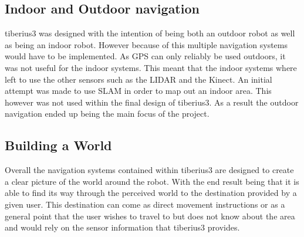 \subsection{Indoor and Outdoor navigation}
\gls{tiberius3} was designed with the intention of being both an outdoor robot as well as being an indoor robot. However because of this multiple navigation systems would have to be implemented. As \gls{GPS} can only reliably be used outdoors, it was not useful for the indoor systems. This meant that the indoor systems where left to use the other sensors such as the \gls{LIDAR} and the Kinect. An initial attempt was made to use \gls{SLAM} in order to map out an indoor area. This however was not used within the final design of \gls{tiberius3}. As a result the outdoor navigation ended up being the main focus of the project.
\subsection{Building a World}
Overall the navigation systems contained within \gls{tiberius3} are designed to create a clear picture of the world around the robot. With the end result being that it is able to find its way through the perceived world to the destination provided by a given user. This destination can come as direct movement instructions or as a general point that the user wishes to travel to but does not know about the area and would rely on the sensor information that \gls{tiberius3} provides.